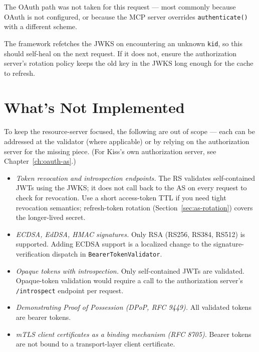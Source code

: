 \begin{description}[style=nextline]
  \item[\texttt{BearerTokenValidator.currentToken()} returns null in a tool method.]  The OAuth path was not taken for this request --- most commonly because OAuth is not configured, or because the MCP server overrides \texttt{authenticate()} with a different scheme.
  \item[Tokens validate the first time but fail after the authorization server rotates keys.]  The framework refetches the JWKS on encountering an unknown \texttt{kid}, so this should self-heal on the next request.  If it does not, ensure the authorization server's rotation policy keeps the old key in the JWKS long enough for the cache to refresh.
\end{description}

\section{What's Not Implemented}
\label{sec:oauth-omissions}

To keep the resource-server focused, the following are out of scope --- each can be addressed at the validator (where applicable) or by relying on the authorization server for the missing piece.  (For Kiss's own authorization server, see Chapter~\ref{ch:oauth-as}.)

\begin{itemize}
  \item \emph{Token revocation and introspection endpoints.}  The RS validates self-contained JWTs using the JWKS; it does not call back to the AS on every request to check for revocation.  Use a short access-token TTL if you need tight revocation semantics; refresh-token rotation (Section~\ref{sec:as-rotation}) covers the longer-lived secret.
  \item \emph{ECDSA, EdDSA, HMAC signatures.}  Only RSA (RS256, RS384, RS512) is supported.  Adding ECDSA support is a localized change to the signature-verification dispatch in \texttt{BearerTokenValidator}.
  \item \emph{Opaque tokens with introspection.}  Only self-contained JWTs are validated.  Opaque-token validation would require a call to the authorization server's \texttt{/introspect} endpoint per request.
  \item \emph{Demonstrating Proof of Possession (DPoP, RFC 9449).}  All validated tokens are bearer tokens.
  \item \emph{mTLS client certificates as a binding mechanism (RFC 8705).}  Bearer tokens are not bound to a transport-layer client certificate.
\end{itemize}

